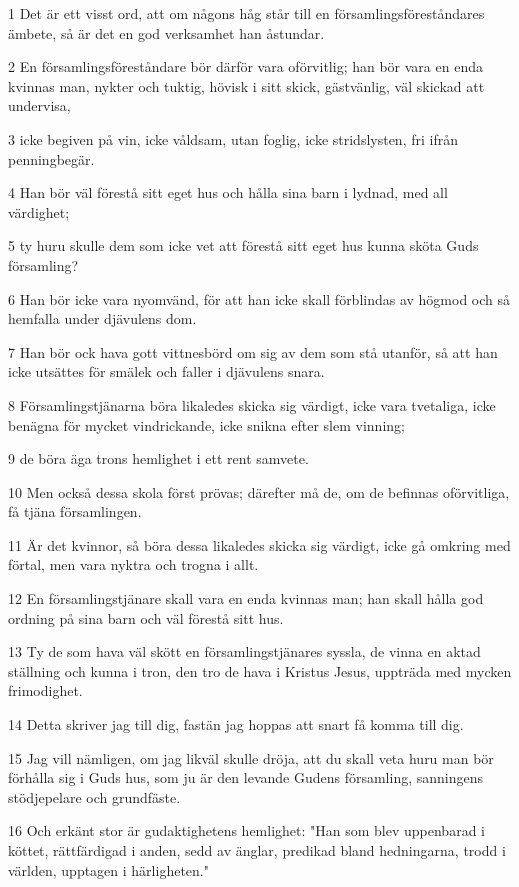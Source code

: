 \par 1 Det är ett visst ord, att om någons håg står till en församlingsföreståndares ämbete, så är det en god verksamhet han åstundar.
\par 2 En församlingsföreståndare bör därför vara oförvitlig; han bör vara en enda kvinnas man, nykter och tuktig, hövisk i sitt skick, gästvänlig, väl skickad att undervisa,
\par 3 icke begiven på vin, icke våldsam, utan foglig, icke stridslysten, fri ifrån penningbegär.
\par 4 Han bör väl förestå sitt eget hus och hålla sina barn i lydnad, med all värdighet;
\par 5 ty huru skulle dem som icke vet att förestå sitt eget hus kunna sköta Guds församling?
\par 6 Han bör icke vara nyomvänd, för att han icke skall förblindas av högmod och så hemfalla under djävulens dom.
\par 7 Han bör ock hava gott vittnesbörd om sig av dem som stå utanför, så att han icke utsättes för smälek och faller i djävulens snara.
\par 8 Församlingstjänarna böra likaledes skicka sig värdigt, icke vara tvetaliga, icke benägna för mycket vindrickande, icke snikna efter slem vinning;
\par 9 de böra äga trons hemlighet i ett rent samvete.
\par 10 Men också dessa skola först prövas; därefter må de, om de befinnas oförvitliga, få tjäna församlingen.
\par 11 Är det kvinnor, så böra dessa likaledes skicka sig värdigt, icke gå omkring med förtal, men vara nyktra och trogna i allt.
\par 12 En församlingstjänare skall vara en enda kvinnas man; han skall hålla god ordning på sina barn och väl förestå sitt hus.
\par 13 Ty de som hava väl skött en församlingstjänares syssla, de vinna en aktad ställning och kunna i tron, den tro de hava i Kristus Jesus, uppträda med mycken frimodighet.
\par 14 Detta skriver jag till dig, fastän jag hoppas att snart få komma till dig.
\par 15 Jag vill nämligen, om jag likväl skulle dröja, att du skall veta huru man bör förhålla sig i Guds hus, som ju är den levande Gudens församling, sanningens stödjepelare och grundfäste.
\par 16 Och erkänt stor är gudaktighetens hemlighet: "Han som blev uppenbarad i köttet, rättfärdigad i anden, sedd av änglar, predikad bland hedningarna, trodd i världen, upptagen i härligheten."

